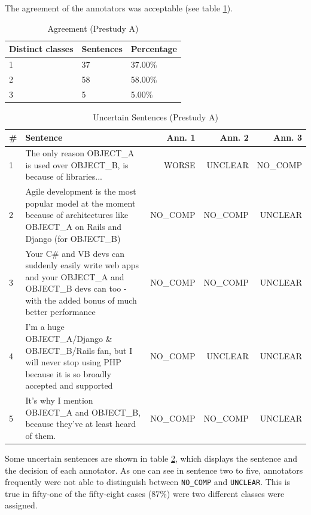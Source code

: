 The agreement of the annotators was acceptable (see table \ref{fig:pre_a_agg}).

\begin{table}[h]
\caption{Agreement (Prestudy A)}
\label{fig:pre_a_agg}
\begin{tabularx}{\textwidth}{XXX}
\toprule
Distinct classes & Sentences & Percentage \\
\midrule
1 & 37 & 37.00\%\\
2 & 58 & 58.00\%\\
3 & 5 & 5.00\%\\
\bottomrule
\end{tabularx}
\end{table}


\begin{table}[h]
\centering
\caption{Uncertain Sentences (Prestudy A)}
\label{tbl:pre_1_res}
\begin{tabularx}{\textwidth}{lXrrr}
\toprule
\# & Sentence        & Ann. 1  & Ann. 2 & Ann. 3             \\ \midrule
1 & The only reason OBJECT\_A is used over OBJECT\_B, is because of libraries... & WORSE & UNCLEAR & NO\_COMP\\
2 & Agile development is the most popular model at the moment because of architectures like OBJECT\_A on Rails and Django (for OBJECT\_B) & NO\_COMP & NO\_COMP & UNCLEAR\\
3 & Your C# and VB devs can suddenly easily write web apps and your OBJECT\_A and OBJECT\_B devs can too - with the added bonus of much better performance &  NO\_COMP & NO\_COMP & UNCLEAR \\
4 & I'm a huge OBJECT\_A/Django \& OBJECT\_B/Rails fan, but I will never stop using PHP because it is so broadly accepted and supported & NO\_COMP & UNCLEAR & UNCLEAR \\
5 & It's why I mention OBJECT\_A and OBJECT\_B, because they've at least heard of them. & NO\_COMP & NO\_COMP & UNCLEAR \\


\bottomrule                              
\end{tabularx}
\end{table}

Some uncertain sentences are shown in table \ref{tbl:pre_1_res}, which displays the sentence and the decision of each annotator. As one can see in sentence two to five, annotators frequently were not able to distinguish between \texttt{NO\_COMP} and \texttt{UNCLEAR}. This is true in fifty-one of the fifty-eight cases (87\%) were two different classes were assigned.\newline

